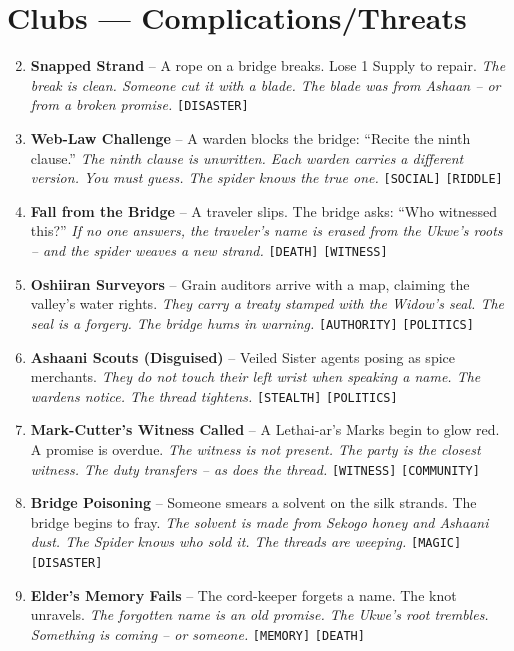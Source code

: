 \section*{Clubs --- Complications/Threats}
\label{sec:lethaiar-complications}
\begin{enumerate}
\setcounter{enumi}{1}
\item \textbf{Snapped Strand} -- A rope on a bridge breaks. Lose 1 Supply to repair.
  \hfill \textit{The break is clean. Someone cut it with a blade. The blade was from Ashaan -- or from a broken promise.} \texttt{[DISASTER]}
\item \textbf{Web-Law Challenge} -- A warden blocks the bridge: ``Recite the ninth clause.''
  \hfill \textit{The ninth clause is unwritten. Each warden carries a different version. You must guess. The spider knows the true one.} \texttt{[SOCIAL]} \texttt{[RIDDLE]}
\item \textbf{Fall from the Bridge} -- A traveler slips. The bridge asks: ``Who witnessed this?''
  \hfill \textit{If no one answers, the traveler's name is erased from the Ukwe's roots -- and the spider weaves a new strand.} \texttt{[DEATH]} \texttt{[WITNESS]}
\item \textbf{Oshiiran Surveyors} -- Grain auditors arrive with a map, claiming the valley's water rights.
  \hfill \textit{They carry a treaty stamped with the Widow's seal. The seal is a forgery. The bridge hums in warning.} \texttt{[AUTHORITY]} \texttt{[POLITICS]}
\item \textbf{Ashaani Scouts (Disguised)} -- Veiled Sister agents posing as spice merchants.
  \hfill \textit{They do not touch their left wrist when speaking a name. The wardens notice. The thread tightens.} \texttt{[STEALTH]} \texttt{[POLITICS]}
\item \textbf{Mark-Cutter's Witness Called} -- A Lethai-ar's Marks begin to glow red. A promise is overdue.
  \hfill \textit{The witness is not present. The party is the closest witness. The duty transfers -- as does the thread.} \texttt{[WITNESS]} \texttt{[COMMUNITY]}
\item \textbf{Bridge Poisoning} -- Someone smears a solvent on the silk strands. The bridge begins to fray.
  \hfill \textit{The solvent is made from Sekogo honey and Ashaani dust. The Spider knows who sold it. The threads are weeping.} \texttt{[MAGIC]} \texttt{[DISASTER]}
\item \textbf{Elder's Memory Fails} -- The cord-keeper forgets a name. The knot unravels.
  \hfill \textit{The forgotten name is an old promise. The Ukwe's root trembles. Something is coming -- or someone.} \texttt{[MEMORY]} \texttt{[DEATH]}

\end{enumerate}
